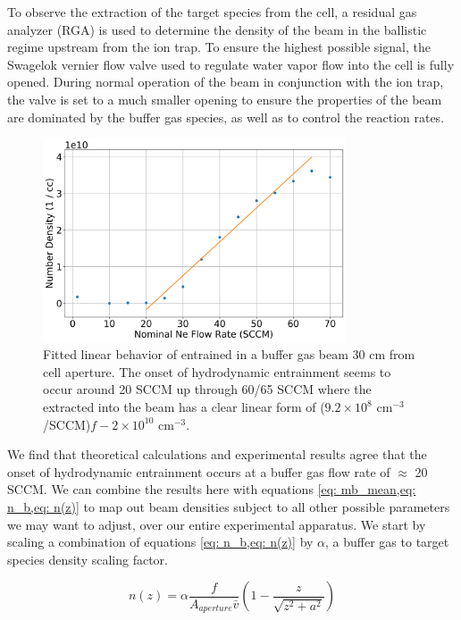 To observe the extraction of the target species from the cell, a residual gas analyzer (RGA) is used to determine the density of the beam in the ballistic regime upstream from the ion trap. To ensure the highest possible signal, the Swagelok vernier flow valve used to regulate water vapor flow into the cell is fully opened. During normal operation of the beam in conjunction with the ion trap, the valve is set to a much smaller opening to ensure the properties of the beam are dominated by the buffer gas species, as well as to control the reaction rates.

\begin{figure}[H]
	\centering
	\includegraphics[width=0.8\textwidth]{images/CBGB_hydrodynamic_fit.png}
	\caption{Fitted linear behavior of  entrained in a  buffer gas beam 30 cm from cell aperture. The onset of hydrodynamic entrainment seems to occur around 20 SCCM up through 60/65 SCCM where the  extracted into the beam has a clear linear form of ($9.2 \times 10^8$ cm$^{-3}$/SCCM)$f - 2 \times 10^{10}$ cm$^{-3}$.}
	\label{fig: rga entrainment}
\end{figure}

We find that theoretical calculations and experimental results agree that the onset of hydrodynamic entrainment occurs at a buffer gas flow rate of $\approx$ 20 SCCM. We can combine the results here with equations \cref{eq: mb_mean,eq: n_b,eq: n(z)} to map out beam densities subject to all other possible parameters we may want to adjust, over our entire experimental apparatus. We start by scaling a combination of equations \cref{eq: n_b,eq: n(z)} by $\alpha$, a buffer gas to target species density scaling factor.

\begin{equation*}
	n(z) = \alpha\frac{f}{A_{aperture} \bar{v}}\left(1-\frac{z}{\sqrt{z^2+a^2}}\right)
\end{equation*}

